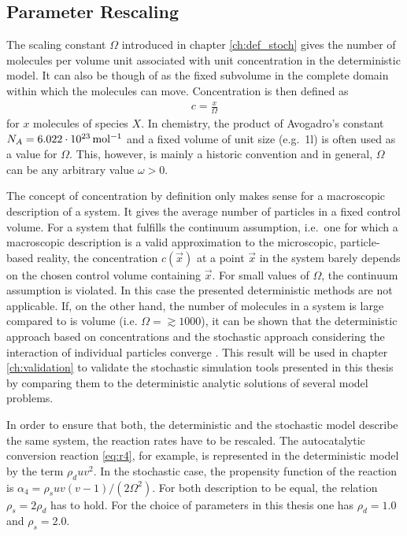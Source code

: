\subsection{Parameter Rescaling}
\label{ch:scaling}
The scaling constant $\Omega$ introduced in chapter \ref{ch:def_stoch} gives the number of molecules per volume unit associated with unit concentration in the deterministic model. It can also be though of as the fixed subvolume in the complete domain within which the molecules can move. Concentration is then defined as 
\begin{align}
c = \frac{x}{\Omega}
\end{align}
for $x$ molecules of species $X$. In chemistry, the product of Avogadro's constant $N_A = \unit[6.022 \cdot 10^{23}]{mol^{-1}}$ and a fixed volume of unit size (e.g.\ 1l) is often used as a value for $\Omega$. This, however, is mainly a historic convention and in general, $\Omega$ can be any arbitrary value $\omega > 0$. 

The concept of concentration by definition only makes sense for a macroscopic description of a system. It gives the average number of particles in a fixed control volume. For a system that fulfills the continuum assumption, i.e.\ one for which a macroscopic description is a valid approximation to the microscopic, particle-based reality, the concentration $c(\vec{x})$ at a point $\vec{x}$ in the system barely depends on the chosen control volume containing $\vec{x}$. For small values of $\Omega$, the continuum assumption is violated. In this case the presented deterministic methods are not applicable. If, on the other hand, the number of molecules in a system is large compared to is volume (i.e. $\Omega = \gtrsim 1000$), it can be shown that the deterministic approach based on concentrations and the stochastic approach considering the interaction of individual particles converge \cite{gillespie_deterministic_2009}. This result will be used in chapter \ref{ch:validation} to validate the stochastic simulation tools presented in this thesis by comparing them to the deterministic analytic solutions of several model problems. 

In order to ensure that both, the deterministic and the stochastic model describe the same system, the reaction rates have to be rescaled. The autocatalytic conversion reaction \eqref{eq:r4}, for example, is represented in the deterministic model by the term $\rho_d u v^2$. In the stochastic case, the propensity function of the reaction is $\alpha_4 = \rho_{s} u v (v-1) / (2 \Omega^2)$. For both description to be equal, the relation $\rho_s = 2 \rho_d$ has to hold. For the choice of parameters in this thesis one has $\rho_d = 1.0$ and $\rho_s = 2.0$.